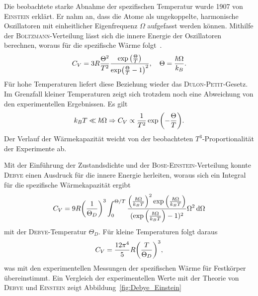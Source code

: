\documentclass[parskip=half, a4paper,twoside,final]{article}
\begin{document}
Die beobachtete starke Abnahme der spezifischen Temperatur wurde 1907 von \textsc{Einstein} erklärt. Er nahm an, dass die Atome als ungekoppelte, harmonische Oszillatoren mit einheitlicher Eigenfrequenz $\Omega$ aufgefasst werden können. Mithilfe der \textsc{Boltzmann}-Verteilung lässt sich die innere Energie der Oszillatoren berechnen, woraus für die spezifische Wärme folgt~\cite{Demtröder3}.
\begin{align}
  C_V = 3R\frac{\Theta^2}{T^2} \frac{\exp\qty(\frac{\Theta}{T})}{\exp(\frac{\Theta}{T}-1)^2}, \quad \Theta = \frac{\hbar \Omega}{k_B}.
\end{align}
Für hohe Temperaturen liefert diese Beziehung wieder das \textsc{Dulon-Petit}-Gesetz. Im Grenzfall kleiner Temperaturen zeigt sich trotzdem noch eine Abweichung von den experimentellen Ergebnissen. Es gilt
\begin{align}
  k_B T \ll \hbar \Omega  \Rightarrow C_V \propto \frac{1}{T^2} \exp\qty(-\frac{\Theta}{T}).
\end{align}
Der Verlauf der Wärmekapazität weicht von der beobachteten $T^3$-Proportionalität der Experimente ab.

Mit der Einführung der Zustandsdichte und der \textsc{Bose-Einstein}-Verteilung konnte \textsc{Debye} einen Ausdruck für die innere Energie herleiten, woraus sich ein Integral für die spezifische Wärmekapazität ergibt
\begin{align}
  C_V = 9R \qty(\frac{1}{\Theta_D})^3 \int_0^{\Theta/T} \frac{\qty(\frac{\hbar\Omega}{k_B T})^2 \exp\qty(\frac{\hbar\Omega}{k_B T})}{(\exp\qty(\frac{\hbar\Omega}{k_B T})-1)^2} \Omega^2 \dd{\Omega}
\end{align}
mit der \textsc{Debye}-Temperatur $\Theta_D$. Für kleine Temperaturen folgt daraus
\begin{align}
  C_V = \frac{12\pi^4}{5}R \qty(\frac{T}{\Theta_D})^3,
\end{align}
was mit den experimentellen Messungen der spezifischen Wärme für Festkörper übereinstimmt. Ein Vergleich der experimentellen Werte mit der Theorie von \textsc{Debye} und \textsc{Einstein} zeigt Abbildung~\ref{fig:Debye_Einstein}
\end{document}
